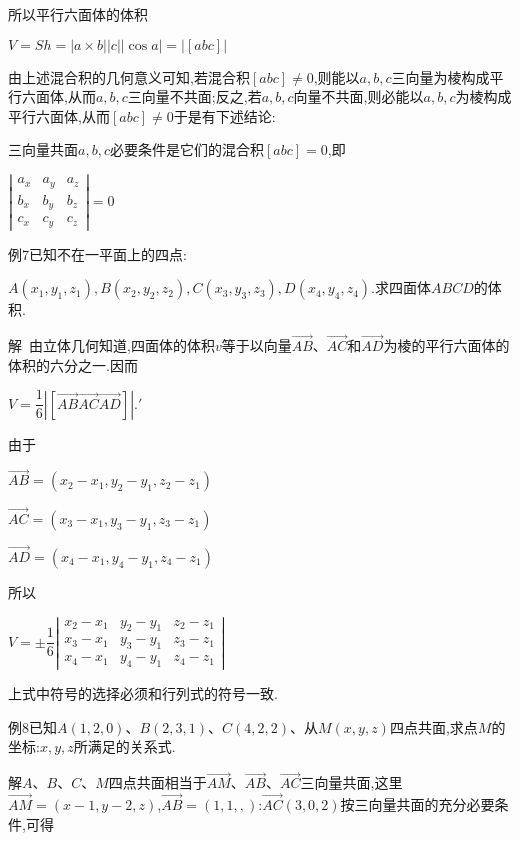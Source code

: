 \documentclass[oneside]{book}
\begin{document}
所以平行六面体的体积

$V = Sh = \left| {a \times b||c} \right|\left| {{{\cos}}a} \right| = \left| {\left[ {abc} \right]} \right|$

由上述混合积的几何意义可知,若混合积$[abc] \ne 0$,则能以$a,b,c$三向量为棱构成平行六面体,从而$a,b,c$三向量不共面;反之,若$a,b,c$向量不共面,则必能以$a,b,c$为棱构成平行六面体,从而$[abc] \ne 0$于是有下述结论:

三向量共面$a,b,c$必要条件是它们的混合积$[abc] = 0$,即

$\left|\begin{array}{lll}{a_{x}} & {a_{y}} & {a_{z}} \\ {b_{x}} & {b_{y}} & {b_{z}} \\ {c_{x}} & {c_{y}} & {c_{z}}\end{array}\right|=0$

例7已知不在一平面上的四点:

$A({x_1},{y_1},{z_1}),B({x_2},{y_2},{z_2}),C({x_3},{y_3},{z_3}){{,}}D({x_4},{y_4},{z_4})$.求四面体$ABCD$的体积.

解~由立体几何知道,四面体的体积$v$等于以向量$\overrightarrow {AB} $、$\overrightarrow {AC} $和$\overrightarrow {AD} $为棱的平行六面体的体积的六分之一.因而

$V = \dfrac{1}{6}\left| {\left[ {\overrightarrow {AB} \overrightarrow {AC} \overrightarrow {AD} } \right]} \right|.'$

由于

$\overrightarrow{A B}=\left(x_{2}-x_{1}, y_{2}-y_{1}, z_{2}-z_{1}\right)$

$\overrightarrow{A C}=\left(x_{3}-x_{1}, y_{3}-y_{1}, z_{3}-z_{1}\right)$

$\overrightarrow{A D}=\left(x_{4}-x_{1}, y_{4}-y_{1}, z_{4}-z_{1}\right)$

所以

$V=\pm \dfrac{1}{6}\left|\begin{array}{lll}{x_{2}-x_{1}} & {y_{2}-y_{1}} & {z_{2}-z_{1}} \\ {x_{3}-x_{1}} & {y_{3}-y_{1}} & {z_{3}-z_{1}} \\ {x_{4}-x_{1}} & {y_{4}-y_{1}} & {z_{4}-z_{1}}\end{array}\right|$

上式中符号的选择必须和行列式的符号一致.

例8已知$A(1,2,0)$、$B(2,3,1)$、$C(4,2,2)$、从$M(x,y,z)$四点共面,求点$M$的坐标:$x,y,z$所满足的关系式.

解$A$、$B$、$C$、$M$四点共面相当于$\overrightarrow {AM} $、$\overrightarrow {AB} $、$\overrightarrow {AC} $三向量共面,这里$\overrightarrow {AM}  = (x - 1,y - 2,z)$,$\overrightarrow {AB}  = \left( {1,1,,} \right)$:$\overrightarrow {AC} (3,0,2)$按三向量共面的充分必要条件,可得
\end{document}
